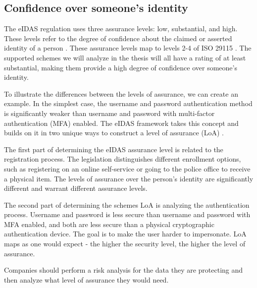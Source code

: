 
\subsection{Confidence over someone's identity}

The eIDAS regulation uses three assurance levels: low, substantial, and high. These levels refer to the degree of confidence about the claimed or asserted identity of a person \cite{eulaw-eidas}. These assurance levels map to levels 2-4 of ISO 29115 \cite{iso29115}. The supported schemes we will analyze in the thesis will all have a rating of at least substantial, making them provide a high degree of confidence over someone's identity.

To illustrate the differences between the levels of assurance, we can create an example. In the simplest case, the {username and password} authentication method is significantly weaker than {username and password} with multi-factor authentication (MFA) enabled. The eIDAS framework takes this concept and builds on it in two unique ways to construct a level of assurance (LoA) \cite{eulaw-eidas-loa}.

The first part of determining the eIDAS assurance level is related to the registration process. The legislation distinguishes different enrollment options, such as registering on an online self-service or going to the police office to receive a physical item. The levels of assurance over the person's identity are significantly different and warrant different assurance levels.

The second part of determining the schemes LoA is analyzing the authentication process. {Username and password} is less secure than {username and password} with MFA enabled, and both are less secure than a physical cryptographic authentication device. The goal is to make the user harder to impersonate. LoA maps as one would expect - the higher the security level, the higher the level of assurance.

Companies should perform a risk analysis for the data they are protecting and then analyze what level of assurance they would need.


